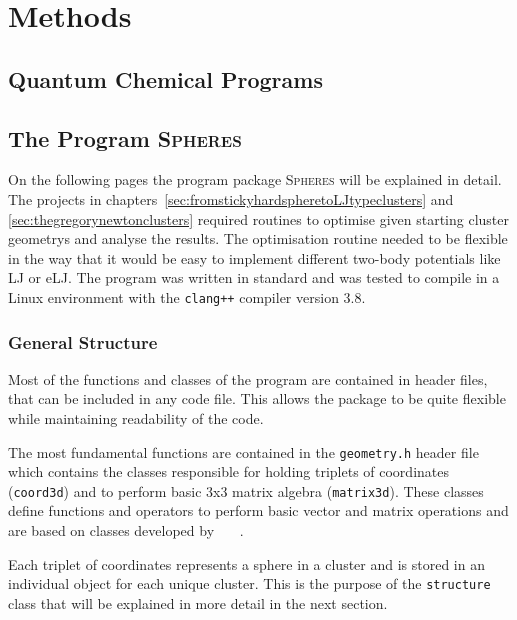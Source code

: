 
\part{Methods}
\label{sec:methods}

\chapter{Quantum Chemical Programs}
\label{sec:quantumchemicalprograms}

\chapter{The Program \textsc{Spheres}}
\label{sec:theprogramspheres}

On the following pages the program package \textsc{Spheres} will be explained
in detail. The projects in
chapters~\ref{sec:fromstickyhardspheretoLJtypeclusters} and
\ref{sec:thegregorynewtonclusters} required routines to optimise given starting
cluster geometrys and analyse the results. The optimisation routine needed to
be flexible in the way that it would be easy to implement different two-body
potentials like \ac{LJ} or \ac{eLJ}. The program was written in standard \Cpp
and was tested to compile in a Linux environment with the \verb|clang++|
compiler version 3.8.

\section{General Structure}
\label{sec:generalstructure}

Most of the functions and classes of the program are contained in header files,
that can be included in any code file. This allows the package to be quite
flexible while maintaining readability of the code.

The most fundamental functions are contained in the \verb|geometry.h| header
file which contains the classes responsible for holding triplets of coordinates
(\verb|coord3d|) and to perform basic 3x3 matrix algebra (\verb|matrix3d|).
These classes define functions and operators to perform basic vector and matrix
operations and are based on classes developed by ~~~.

Each triplet of coordinates represents a sphere in a cluster and is stored in
an individual object for each unique cluster. This is the purpose of the
\verb|structure| class that will be explained in more detail in the next
section.

